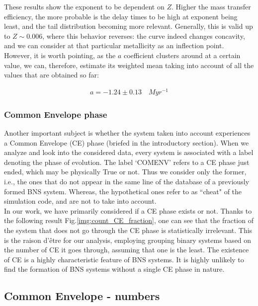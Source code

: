 \documentclass[preprint,12pt]{elsarticle}
\begin{document}
These results show the exponent to be dependent on $Z$. Higher the mass transfer efficiency, the more probable is the delay times to be high at exponent being least, and the tail distribution becoming more relevant. Generally, this is valid up to $Z \sim 0.006$, where this behavior reverses: the curve indeed changes concavity, and we can consider at that particular metallicity as an inflection point.\\
However, it is worth pointing, as the $a$ coefficient clusters around at a certain value, we can, therefore, estimate its weighted mean taking into account of all the values that are obtained so far:

\begin{align}
   a = -1.24 \pm 0.13 \quad Myr^{-1}
   \label{value:a_coefficient}
\end{align}


\subsubsection{\textbf{Common Envelope phase}}
Another important subject is whether the system taken into account experiences a Common Envelope (CE) phase (briefed in the introductory section). When we analyze and look into the considered data, every system is associated with a label denoting the phase of evolution. The label `COMENV' refers to a CE phase just ended, which may be physically True or not. Thus we consider only the former, i.e., the ones that do not appear in the same line of the database of a previously formed BNS system. Whereas, the hypothetical ones refer to as ``cheat" of the simulation code, and are not to take into account.\\
In our work, we have primarily considered if a CE phase exists or not. Thanks to the following result Fig.\ref{img:count_CE_fraction}, one can see that the fraction of the system that does not go through the CE phase is statistically irrelevant. This is the raison d'être for our analysis, employing grouping binary systems based on the number of CE it goes through, assuming that one is the least. The existence of CE is a highly characteristic feature of BNS systems. It is highly unlikely to find the formation of BNS systems without a single CE phase in nature. 


\subsection{\textbf{Common Envelope - numbers}}
\end{document}
